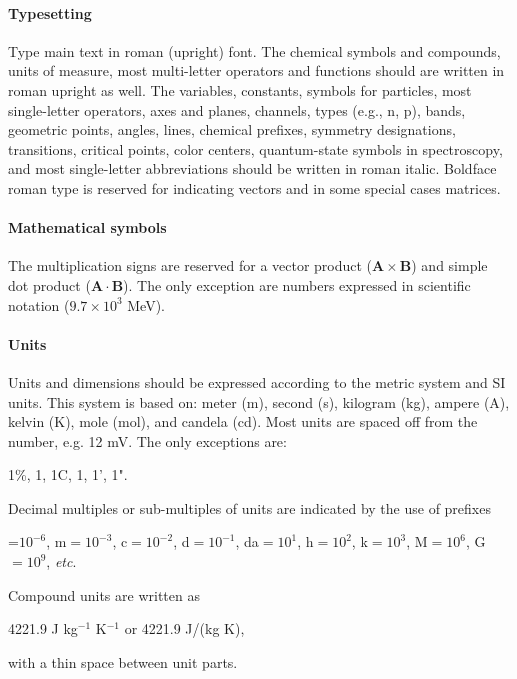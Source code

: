 \documentclass[USenglish,oneside,twocolumn]{article}
\begin{document}
\paragraph{Typesetting}
    Type main text in roman (upright) font. The chemical symbols and compounds, units of measure, most multi-letter operators and functions should are written in roman upright as well. The variables, constants, symbols for particles, most single-letter operators, axes and planes, channels, types (e.g., n, p), bands, geometric points, angles, lines, chemical prefixes, symmetry designations, transitions, critical points, color centers, quantum-state symbols in spectroscopy, and most single-letter abbreviations should be written in roman italic. Boldface roman type is reserved for indicating vectors and in some special cases matrices. 


\paragraph{Mathematical symbols}
    The multiplication signs are reserved for a vector product ($\mathbf{A}\times\mathbf{B}$) and simple dot product ($\mathbf{A}\cdot\mathbf{B}$). The only exception are numbers expressed in scientific notation ($9.7\times 10^3$ MeV).


\paragraph{Units}
    Units and dimensions should be expressed according to the metric system and SI units. This system is based on: meter (m), second (s), kilogram (kg), ampere (A), kelvin (K), mole (mol), and candela (cd). Most units are spaced off from the number, e.g. 12 mV. The only exceptions are:
\begin{center}
    1\%, 1\textperthousand, 1\textdegree C, 1\textdegree, 1', 1".
\end{center}

    Decimal multiples or sub-multiples of units are indicated by the use of prefixes

\begin{center}
    \textmu=$10^{-6}$, m$=10^{-3}$, c$=10^{-2}$, d$=10^{-1}$,
    da$=10^1$, h$=10^2$, k$=10^3$, M$=10^6$, G$=10^9$, {\em etc}.
\end{center}

    Compound units are written as
\begin{center}
    4221.9 J kg$^{-1}$ K$^{-1}$ or 4221.9 J/(kg K),
\end{center}
    with a thin space between unit parts.
\end{document}
